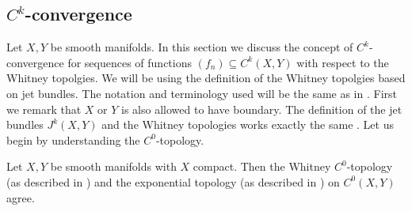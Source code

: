 \subsection{$C^k$-convergence}

Let $X,Y$ be smooth manifolds. In this section we discuss the concept of $C^k$-convergence for sequences of functions $(f_n) \subseteq C^k(X,Y)$ with respect to the Whitney topolgies. We will be using the definition of the Whitney topolgies based on jet bundles. The notation and terminology used will be the same as in \cite{golubitsky2012stable}. First we remark that $X$ or $Y$ is also allowed to have boundary. The definition of the jet bundles $J^k(X,Y)$ and the Whitney topologies works exactly the same \footnotemark. Let us begin by understanding the $C^0$-topology.


\begin{lemma}
    \label{whitney_top:lem:c0_and_exponential_topology_agree}
    Let $X,Y$ be smooth manifolds with $X$ compact. Then the Whitney $C^0$-topology (as described in \cite{golubitsky2012stable}) and the exponential topology (as described in \cite{steimle_topo}) on $C^0(X,Y)$ agree.
\end{lemma}

